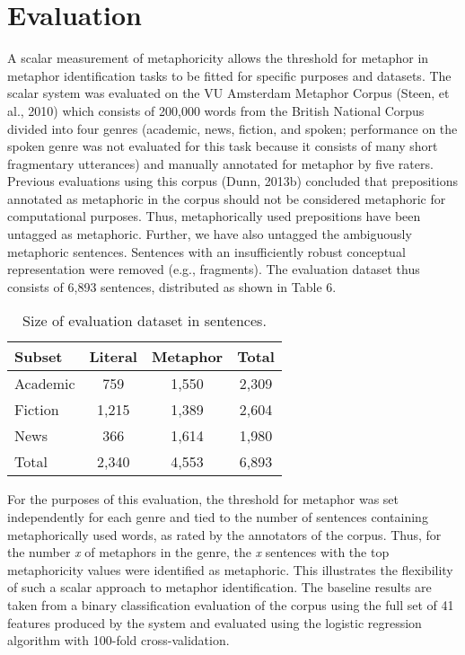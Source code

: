 \documentclass[11pt]{article}
\begin{document}
\section{Evaluation}

A scalar measurement of metaphoricity allows the threshold for metaphor in metaphor identification tasks to be fitted for specific purposes and datasets. The scalar system was evaluated on the VU Amsterdam Metaphor Corpus (Steen, et al., 2010) which consists of 200,000 words from the British National Corpus divided into four genres (academic, news, fiction, and spoken; performance on the spoken genre was not evaluated for this task because it consists of many short fragmentary utterances) and manually annotated for metaphor by five raters. Previous evaluations using this corpus (Dunn, 2013b) concluded that prepositions annotated as metaphoric in the corpus should not be considered metaphoric for computational purposes. Thus, metaphorically used prepositions have been untagged as metaphoric. Further, we have also untagged the ambiguously metaphoric sentences. Sentences with an insufficiently robust conceptual representation were removed (e.g., fragments). The evaluation dataset thus consists of 6,893 sentences, distributed as shown in Table 6. 

\begin{table}[h]
\begin{center}
\begin{tabular}{|l|c|c|c|}
\hline \bf Subset & \bf Literal & \bf Metaphor & \bf Total \\ \hline
Academic & 759 & 1,550 & 2,309 \\
Fiction & 1,215 & 1,389 & 2,604 \\
News & 366 & 1,614 & 1,980 \\
Total & 2,340 & 4,553 & 6,893 \\
\hline
\end{tabular}
\end{center}
\caption{\label{font-table} Size of evaluation dataset in sentences. }
\end{table}


For the purposes of this evaluation, the threshold for metaphor was set independently for each genre and tied to the number of sentences containing metaphorically used words, as rated by the annotators of the corpus. Thus, for the number {\em x}  of metaphors in the genre, the {\em x} sentences with the top metaphoricity values were identified as metaphoric. This illustrates the flexibility of such a scalar approach to metaphor identification. The baseline results are taken from a binary classification evaluation of the corpus using the full set of 41 features produced by the system and evaluated using the logistic regression algorithm with 100-fold cross-validation.
\end{document}
